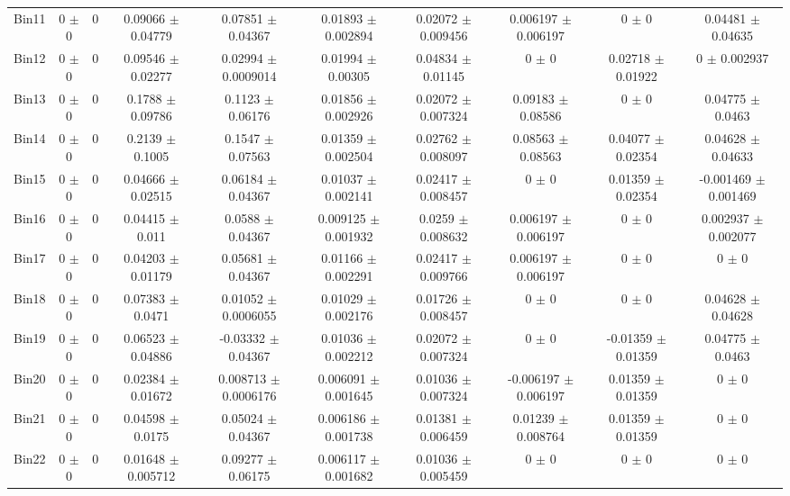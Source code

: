 \begin{tabular}{@{\extracolsep{4pt}}lccccccccc@{}}
     Bin11 & 0 $\pm$ 0 & 0 & 0.09066 $\pm$ 0.04779 & 0.07851 $\pm$ 0.04367 & 0.01893 $\pm$ 0.002894 & 0.02072 $\pm$ 0.009456 & 0.006197 $\pm$ 0.006197 & 0 $\pm$ 0 & 0.04481 $\pm$ 0.04635 \\ 
     Bin12 & 0 $\pm$ 0 & 0 & 0.09546 $\pm$ 0.02277 & 0.02994 $\pm$ 0.0009014 & 0.01994 $\pm$ 0.00305 & 0.04834 $\pm$ 0.01145 & 0 $\pm$ 0 & 0.02718 $\pm$ 0.01922 & 0 $\pm$ 0.002937 \\ 
     Bin13 & 0 $\pm$ 0 & 0 & 0.1788 $\pm$ 0.09786 & 0.1123 $\pm$ 0.06176 & 0.01856 $\pm$ 0.002926 & 0.02072 $\pm$ 0.007324 & 0.09183 $\pm$ 0.08586 & 0 $\pm$ 0 & 0.04775 $\pm$ 0.0463 \\ 
     Bin14 & 0 $\pm$ 0 & 0 & 0.2139 $\pm$ 0.1005 & 0.1547 $\pm$ 0.07563 & 0.01359 $\pm$ 0.002504 & 0.02762 $\pm$ 0.008097 & 0.08563 $\pm$ 0.08563 & 0.04077 $\pm$ 0.02354 & 0.04628 $\pm$ 0.04633 \\ 
     Bin15 & 0 $\pm$ 0 & 0 & 0.04666 $\pm$ 0.02515 & 0.06184 $\pm$ 0.04367 & 0.01037 $\pm$ 0.002141 & 0.02417 $\pm$ 0.008457 & 0 $\pm$ 0 & 0.01359 $\pm$ 0.02354 & -0.001469 $\pm$ 0.001469 \\ 
     Bin16 & 0 $\pm$ 0 & 0 & 0.04415 $\pm$ 0.011 & 0.0588 $\pm$ 0.04367 & 0.009125 $\pm$ 0.001932 & 0.0259 $\pm$ 0.008632 & 0.006197 $\pm$ 0.006197 & 0 $\pm$ 0 & 0.002937 $\pm$ 0.002077 \\ 
     Bin17 & 0 $\pm$ 0 & 0 & 0.04203 $\pm$ 0.01179 & 0.05681 $\pm$ 0.04367 & 0.01166 $\pm$ 0.002291 & 0.02417 $\pm$ 0.009766 & 0.006197 $\pm$ 0.006197 & 0 $\pm$ 0 & 0 $\pm$ 0 \\ 
     Bin18 & 0 $\pm$ 0 & 0 & 0.07383 $\pm$ 0.0471 & 0.01052 $\pm$ 0.0006055 & 0.01029 $\pm$ 0.002176 & 0.01726 $\pm$ 0.008457 & 0 $\pm$ 0 & 0 $\pm$ 0 & 0.04628 $\pm$ 0.04628 \\ 
     Bin19 & 0 $\pm$ 0 & 0 & 0.06523 $\pm$ 0.04886 & -0.03332 $\pm$ 0.04367 & 0.01036 $\pm$ 0.002212 & 0.02072 $\pm$ 0.007324 & 0 $\pm$ 0 & -0.01359 $\pm$ 0.01359 & 0.04775 $\pm$ 0.0463 \\ 
     Bin20 & 0 $\pm$ 0 & 0 & 0.02384 $\pm$ 0.01672 & 0.008713 $\pm$ 0.0006176 & 0.006091 $\pm$ 0.001645 & 0.01036 $\pm$ 0.007324 & -0.006197 $\pm$ 0.006197 & 0.01359 $\pm$ 0.01359 & 0 $\pm$ 0 \\ 
     Bin21 & 0 $\pm$ 0 & 0 & 0.04598 $\pm$ 0.0175 & 0.05024 $\pm$ 0.04367 & 0.006186 $\pm$ 0.001738 & 0.01381 $\pm$ 0.006459 & 0.01239 $\pm$ 0.008764 & 0.01359 $\pm$ 0.01359 & 0 $\pm$ 0 \\ 
     Bin22 & 0 $\pm$ 0 & 0 & 0.01648 $\pm$ 0.005712 & 0.09277 $\pm$ 0.06175 & 0.006117 $\pm$ 0.001682 & 0.01036 $\pm$ 0.005459 & 0 $\pm$ 0 & 0 $\pm$ 0 & 0 $\pm$ 0 \\ 

\end{tabular}

